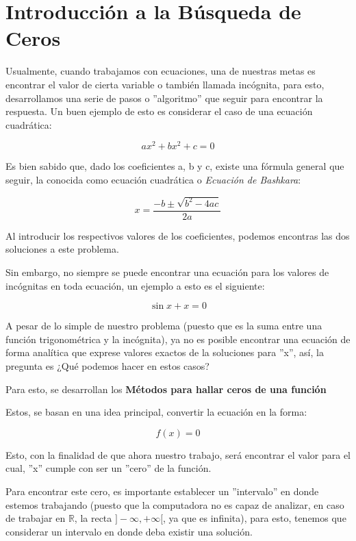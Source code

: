 \section{Introducción a la Búsqueda de Ceros}

Usualmente, cuando trabajamos con ecuaciones, una de nuestras metas es encontrar el valor de cierta variable o también llamada incógnita, para esto, desarrollamos una serie de pasos o ''algoritmo'' que seguir para encontrar la respuesta. Un buen ejemplo de esto es considerar el caso de una ecuación cuadrática:

\begin{equation}
ax^2 + bx^2 +c = 0
\end{equation}

Es bien sabido que, dado los coeficientes a, b y c, existe una fórmula general que seguir, la conocida como ecuación cuadrática o \textit{Ecuación de Bashkara}:

\begin{equation}
x = \frac{-b \pm \sqrt{b^2-4ac}}{2a}
\end{equation}

Al introducir los respectivos valores de los coeficientes, podemos encontras las dos soluciones a este problema.

Sin embargo, no siempre se puede encontrar una ecuación para los valores de incógnitas en toda ecuación, un ejemplo a esto es el siguiente:

\begin{equation}
\sin x + x = 0
\end{equation}

A pesar de lo simple de nuestro problema (puesto que es la suma entre una función trigonométrica y la incógnita), ya no es posible encontrar una ecuación de forma analítica que exprese valores exactos de la soluciones para ''x'', así, la pregunta es ¿Qué podemos hacer en estos casos?

Para esto, se desarrollan los \textbf{Métodos para hallar ceros de una función}

Estos, se basan en una idea principal, convertir la ecuación en la forma:

\begin{equation}
    f(x) = 0
\end{equation}

Esto, con la finalidad de que ahora nuestro trabajo, será encontrar el valor para el cual, ''x'' cumple con ser un ''cero'' de la función.

Para encontrar este cero, es importante establecer un ''intervalo'' en donde estemos trabajando (puesto que la computadora no es capaz de analizar, en caso de trabajar en $\mathbb{R}$, la recta $]-\infty,+ \infty[$, ya que es infinita), para esto, tenemos que considerar un intervalo en donde deba existir una solución.

